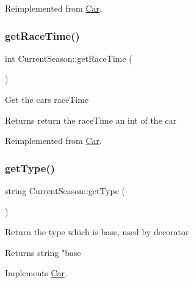Reimplemented from \hyperlink{classCar_a0e0b71dc2b09be094ffb08e5b73c8ea2}{Car}.

\mbox{\label{classCurrentSeason_a15328f2c4192d344e970ce111a96946f}} 
\subsubsection{\texorpdfstring{get\+Race\+Time()}{getRaceTime()}}
{\footnotesize\ttfamily int Current\+Season\+::get\+Race\+Time (\begin{DoxyParamCaption}{ }\end{DoxyParamCaption})\hspace{0.3cm}{\ttfamily [virtual]}}

Get the cars race\+Time \begin{DoxyReturn}{Returns}
return the race\+Time an int of the car 
\end{DoxyReturn}


Reimplemented from \hyperlink{classCar_ac30e13eba209c1ca3bba99bf6741094a}{Car}.

\mbox{\label{classCurrentSeason_abeb85d64969c9fd4945bf64ab0464ccd}} 
\subsubsection{\texorpdfstring{get\+Type()}{getType()}}
{\footnotesize\ttfamily string Current\+Season\+::get\+Type (\begin{DoxyParamCaption}{ }\end{DoxyParamCaption})\hspace{0.3cm}{\ttfamily [virtual]}}

Return the type which is base, used by decorator \begin{DoxyReturn}{Returns}
string "base 
\end{DoxyReturn}


Implements \hyperlink{classCar_ae502eb1c04753317ebdb759497fd030c}{Car}.

\mbox{\label{classCurrentSeason_a58d31e4029253b1c244ee44f0052916f}} 
